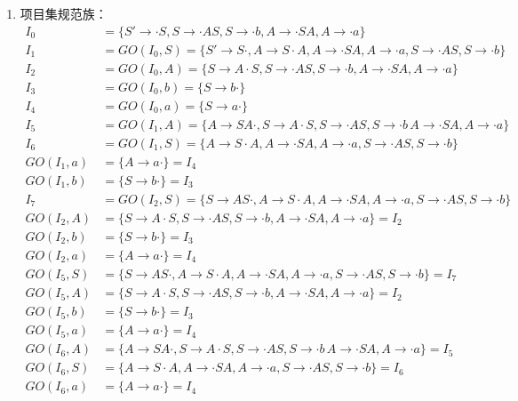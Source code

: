 \begin{enumerate}
	\item 项目集规范族：
	\begin{align*}
		I_{0} &= \{S' \to \cdot S, S \to \cdot AS, S \to \cdot b, A \to \cdot SA, A \to \cdot a\} \\	
		I_{1} &= GO(I_{0}, S) = \{S' \to S \cdot, A \to S \cdot A, A \to \cdot SA, A \to \cdot a, S \to \cdot AS, S \to \cdot b\} \\
		I_{2} &= GO(I_{0}, A) = \{S \to A \cdot S, S \to \cdot AS, S \to \cdot b, A \to \cdot SA, A \to \cdot a\} \\
		I_{3} &= GO(I_{0}, b) = \{S \to b \cdot\} \\
		I_{4} &= GO(I_{0}, a) = \{S \to a \cdot\} \\
		I_{5} &= GO(I_{1}, A) = \{A \to SA \cdot, S \to A \cdot S, S \to \cdot AS, S \to \cdot b\, A \to \cdot SA, A \to \cdot a\} \\	
		I_{6} &= GO(I_{1}, S) = \{A \to S \cdot A, A \to \cdot SA, A \to \cdot a, S \to \cdot AS, S \to \cdot b\} \\	
		GO(I_{1}, a)&= \{A \to a \cdot\} = I_{4} \\	
		GO(I_{1}, b)&= \{S \to b \cdot\} = I_{3}\\
		I_{7} &= GO(I_{2}, S) = \{S \to AS \cdot, A \to S \cdot A, A \to \cdot SA, A \to \cdot a, S \to \cdot AS, S \to \cdot b\} \\
		GO(I_{2}, A)&= \{S \to A \cdot S, S \to \cdot AS, S \to \cdot b, A \to \cdot SA, A \to \cdot a\} = I_{2} \\
		GO(I_{2}, b)&= \{S \to b \cdot\}=I_{3} \\
		GO(I_{2}, a)&= \{A \to a \cdot\}=I_{4} \\
		GO(I_{5}, S)&= \{S \to AS \cdot, A \to S \cdot A, A \to \cdot SA, A \to \cdot a, S \to \cdot AS, S \to \cdot b\}=I_{7} \\
		GO(I_{5}, A)&= \{S \to A \cdot S, S \to \cdot AS, S \to \cdot b, A \to \cdot SA, A \to \cdot a\}=I_{2} \\
		GO(I_{5}, b)&= \{S \to b \cdot\}=I_{3} \\
		GO(I_{5}, a)&= \{A \to a \cdot\}=I_{4} \\
		GO(I_{6}, A)&= \{A \to SA \cdot, S \to A \cdot S, S \to \cdot AS, S \to \cdot b\, A \to \cdot SA, A \to \cdot a\}=I_{5} \\
		GO(I_{6}, S)&= \{A \to S \cdot A, A \to \cdot SA, A \to \cdot a, S \to \cdot AS, S \to \cdot b\}=I_{6} \\
		GO(I_{6}, a)&= \{A \to a \cdot\}=I_{4} \\

\end{align*}
\end{enumerate}
